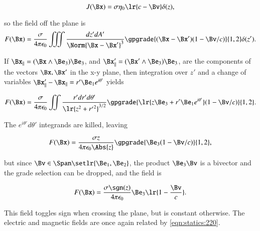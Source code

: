 \begin{dmath}\label{eqn:statics:240}
J(\Bx) = \sigma \eta_0 \lr{ c - \Bv } \delta(z),
\end{dmath}

so the field off the plane is
\begin{dmath}\label{eqn:statics:260}
F(\Bx)
=
\frac{\sigma}{4 \pi \epsilon_0 } \iiint \frac{dz' dA'}{ \Norm{ \Bx - \Bx' }^3 }
\gpgrade{ (\Bx - \Bx') (1 - \Bv/c) }{1,2} \delta(z').
\end{dmath}

If \( \Bx_\parallel = (\Bx \wedge \Be_3) \Be_3 \), and \( \Bx'_\parallel = (\Bx' \wedge \Be_3) \Be_3 \), are the components of the vectors \( \Bx, \Bx' \) in the x-y plane, then integration over \( z' \) and a change of variables \( \Bx'_\parallel - \Bx_\parallel = r' \Be_1 e^{i \theta'} \) yields

\begin{dmath}\label{eqn:statics:280}
F(\Bx)
=
\frac{\sigma}{4 \pi \epsilon_0 } \iint \frac{r' dr' d\theta'}{ \lr{ z^2 + {r'}^2 }^{3/2} }
\gpgrade{ \lr{ z \Be_3 + r' \Be_1 e^{i\theta'} } (1 - \Bv/c) }{1,2}.
\end{dmath}

The \( e^{i\theta'} d\theta' \) integrands are killed, leaving

\begin{dmath}\label{eqn:statics:300}
F(\Bx)
=
\frac{\sigma z}{4 \pi \epsilon_0 \Abs{z} } \gpgrade{ \Be_3 (1 - \Bv/c) }{1,2},
\end{dmath}

but since \( \Bv \in \Span \setlr{ \Be_1, \Be_2 } \), the product \( \Be_3 \Bv \) is a bivector and the grade selection can be dropped, and the field is

\begin{dmath}\label{eqn:statics:320}
F(\Bx)
=
\frac{\sigma \sgn(z)}{4 \pi \epsilon_0 } \Be_3 \lr{ 1 - \frac{\Bv}{c}}.
\end{dmath}

This field toggles sign when crossing the plane, but is constant otherwise.  The electric and magnetic fields are once again related by \cref{eqn:statics:220}.

